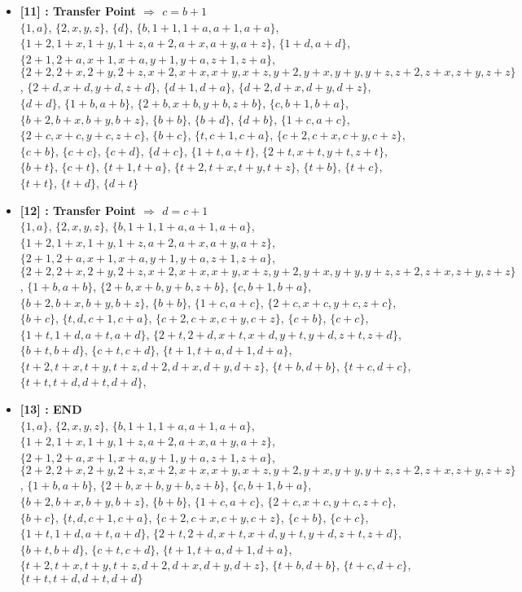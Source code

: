 \begin{itemize}
    \item \textbf{[11] : Transfer Point $\Rightarrow$ $c = b + 1$}\\
        $\{1, a\}$, $\{2, x, y, z\}$, $\{d\}$, $\{b, 1 + 1, 1 + a, a + 1, a + a\}$, $\{1 + 2, 1 + x, 1 + y, 1 + z, a + 2, a + x, a + y, a + z\}$, $\{1 + d, a + d\}$, $\{2 + 1, 2 + a, x + 1, x + a, y + 1, y + a, z + 1, z + a\}$, $\{2 + 2, 2 + x, 2 + y, 2 + z, x + 2, x + x, x + y, x + z, y + 2, y + x, y + y, y + z, z + 2, z + x, z + y, z + z\}$, $\{2 + d, x + d, y + d, z + d\}$, $\{d + 1, d + a\}$, $\{d + 2, d + x, d + y, d + z\}$, $\{d + d\}$, $\{1 + b, a + b\}$, $\{2 + b, x + b, y + b, z + b\}$, $\{c, b + 1, b + a\}$, $\{b + 2, b + x, b + y, b + z\}$, $\{b + b\}$, $\{b + d\}$, $\{d + b\}$, $\{1 + c, a + c\}$, $\{2 + c, x + c, y + c, z + c\}$, $\{b + c\}$, $\{t, c + 1, c + a\}$, $\{c + 2, c + x, c + y, c + z\}$, $\{c + b\}$, $\{c + c\}$, $\{c + d\}$, $\{d + c\}$, $\{1 + t, a + t\}$, $\{2 + t, x + t, y + t, z + t\}$, $\{b + t\}$, $\{c + t\}$, $\{t + 1, t + a\}$, $\{t + 2, t + x, t + y, t + z\}$, $\{t + b\}$, $\{t + c\}$, $\{t + t\}$, $\{t + d\}$, $\{d + t\}$

    \item \textbf{[12] : Transfer Point $\Rightarrow$ $d = c + 1$}\\
        $\{1, a\}$, $\{2, x, y, z\}$, $\{b, 1 + 1, 1 + a, a + 1, a + a\}$, $\{1 + 2, 1 + x, 1 + y, 1 + z, a + 2, a + x, a + y, a + z\}$, $\{2 + 1, 2 + a, x + 1, x + a, y + 1, y + a, z + 1, z + a\}$, $\{2 + 2, 2 + x, 2 + y, 2 + z, x + 2, x + x, x + y, x + z, y + 2, y + x, y + y, y + z, z + 2, z + x, z + y, z + z\}$, $\{1 + b, a + b\}$, $\{2 + b, x + b, y + b, z + b\}$, $\{c, b + 1, b + a\}$, $\{b + 2, b + x, b + y, b + z\}$, $\{b + b\}$, $\{1 + c, a + c\}$, $\{2 + c, x + c, y + c, z + c\}$, $\{b + c\}$, $\{t, d, c + 1, c + a\}$, $\{c + 2, c + x, c + y, c + z\}$, $\{c + b\}$, $\{c + c\}$, $\{1 + t, 1 + d, a + t, a + d\}$, $\{2 + t, 2 + d, x + t, x + d, y + t, y + d, z + t, z + d\}$, $\{b + t, b + d\}$, $\{c + t, c + d\}$, $\{t + 1, t + a, d + 1, d + a\}$, $\{t + 2, t + x, t + y, t + z, d + 2, d + x, d + y, d + z\}$, $\{t + b, d + b\}$, $\{t + c, d + c\}$, $\{t + t, t + d, d + t, d + d\}$, 

    \item \textbf{[13] : END}\\
        $\{1, a\}$, $\{2, x, y, z\}$, $\{b, 1 + 1, 1 + a, a + 1, a + a\}$, $\{1 + 2, 1 + x, 1 + y, 1 + z, a + 2, a + x, a + y, a + z\}$, $\{2 + 1, 2 + a, x + 1, x + a, y + 1, y + a, z + 1, z + a\}$, $\{2 + 2, 2 + x, 2 + y, 2 + z, x + 2, x + x, x + y, x + z, y + 2, y + x, y + y, y + z, z + 2, z + x, z + y, z + z\}$, $\{1 + b, a + b\}$, $\{2 + b, x + b, y + b, z + b\}$, $\{c, b + 1, b + a\}$, $\{b + 2, b + x, b + y, b + z\}$, $\{b + b\}$, $\{1 + c, a + c\}$, $\{2 + c, x + c, y + c, z + c\}$, $\{b + c\}$, $\{t, d, c + 1, c + a\}$, $\{c + 2, c + x, c + y, c + z\}$, $\{c + b\}$, $\{c + c\}$, $\{1 + t, 1 + d, a + t, a + d\}$, $\{2 + t, 2 + d, x + t, x + d, y + t, y + d, z + t, z + d\}$, $\{b + t, b + d\}$, $\{c + t, c + d\}$, $\{t + 1, t + a, d + 1, d + a\}$, $\{t + 2, t + x, t + y, t + z, d + 2, d + x, d + y, d + z\}$, $\{t + b, d + b\}$, $\{t + c, d + c\}$, $\{t + t, t + d, d + t, d + d\}$


\end{itemize}
